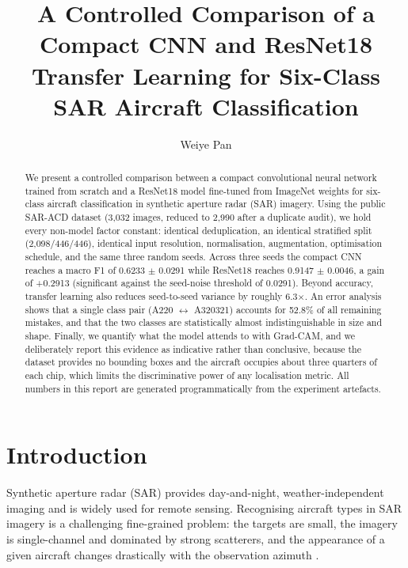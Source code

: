 \documentclass[sigconf, screen]{acmart}
\begin{document}
\title{A Controlled Comparison of a Compact CNN and ResNet18 Transfer Learning
for Six-Class SAR Aircraft Classification}

\author{Weiye Pan}
\email{}

\begin{abstract}
We present a controlled comparison between a compact convolutional neural network
trained from scratch and a ResNet18 model fine-tuned from ImageNet weights for
six-class aircraft classification in synthetic aperture radar (SAR) imagery.
Using the public SAR-ACD dataset (3,032 images, reduced to 2,990
after a duplicate audit), we hold every non-model factor constant: identical
deduplication, an identical stratified split (2,098/446/446),
identical input resolution, normalisation, augmentation, optimisation schedule,
and the same three random seeds. Across three seeds the compact CNN reaches a
macro F1 of 0.6233 $\pm$ 0.0291 while ResNet18 reaches 0.9147 $\pm$ 0.0046, a gain of +0.2913
(significant against the seed-noise threshold of 0.0291). Beyond accuracy,
transfer learning also reduces seed-to-seed variance by roughly 6.3$\times$.
An error analysis shows that a single class pair (A220 $\leftrightarrow$ A320321)
accounts for 52.8\% of all remaining mistakes, and that the two classes
are statistically almost indistinguishable in size and shape. Finally, we quantify
what the model attends to with Grad-CAM, and we deliberately report this evidence
as indicative rather than conclusive, because the dataset provides no bounding
boxes and the aircraft occupies about three quarters of each chip, which limits
the discriminative power of any localisation metric. All numbers in this report
are generated programmatically from the experiment artefacts.
\end{abstract}


\maketitle

\section{Introduction}

Synthetic aperture radar (SAR) provides day-and-night, weather-independent
imaging and is widely used for remote sensing. Recognising aircraft types in SAR
imagery is a challenging fine-grained problem: the targets are small, the imagery
is single-channel and dominated by strong scatterers, and the appearance of a
given aircraft changes drastically with the observation azimuth
\cite{sarsurvey2016}.
\end{document}
